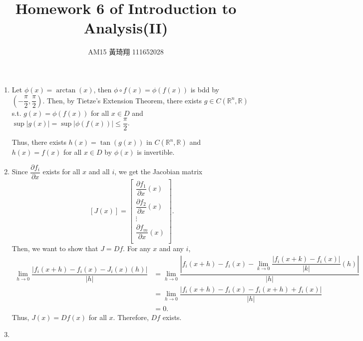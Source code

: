 \documentclass[12pt]{article}
\title{Homework 6 of Introduction to Analysis(II)}
\author{AM15 黃琦翔 111652028}
\begin{document}
\maketitle
\begin{enumerate}
    \item Let $\phi(x) = \arctan(x)$, then $\phi \circ f(x) = \phi(f(x))$ is bdd by $(-\dfrac{\pi}{2}, \dfrac{\pi}{2})$.
    Then, by Tietze's Extension Theorem, there exists $g \in C(\mathbb{R}^n, \mathbb{R})$ s.t. 
    $g(x) = \phi(f(x))$ for all $x\in D$ and $\sup|g(x)| = \sup |\phi(f(x))|\leq \dfrac{\pi}{2}$.

    Thus, there exists $h(x) = \tan(g(x))$ in $C(\mathbb{R}^n, \mathbb{R})$ and $h(x) = f(x)$ for all $x\in D$ by 
    $\phi(x)$ is invertible.

    \item Since $\dfrac{\partial f_i}{\partial x}$ exists for all $x$ and all $i$, 
    we get the Jacobian matrix $$\left[J(x)\right] = \begin{bmatrix}
        \dfrac{\partial f_1}{\partial x}(x)\\
        \dfrac{\partial f_2}{\partial x}(x)\\
        \vdots\\
        \dfrac{\partial f_m}{\partial x}(x)\\
    \end{bmatrix}.$$
    Then, we want to show that $J = Df$.
    For any $x$ and any $i$, \begin{align*}
        \lim_{h\to 0} \dfrac{|f_i(x+h) - f_i(x) - J_i(x)(h)|}{|h|} &= \lim_{h\to 0} \dfrac{|f_i(x+h) - f_i(x) - \displaystyle\lim_{k\to 0}\dfrac{|f_i(x+k) - f_i(x)|}{|k|}(h)|}{|h|}\\
        &= \lim_{h\to 0} \dfrac{|f_i(x+h) - f_i(x) - f_i(x+h) + f_i(x)|}{|h|}\\
        &= 0.
    \end{align*}
    Thus, $J(x) = Df(x)$ for all $x$.
    Therefore, $Df$ exists.

    \item 
\end{enumerate}
\end{document}
